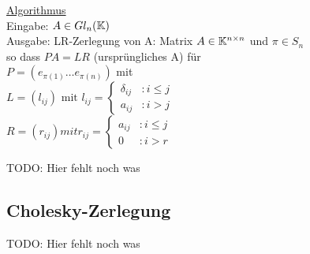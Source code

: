 \underline{Algorithmus} \\
Eingabe: $A \in Gl_n (\mathbb K)$ \\
Ausgabe: LR-Zerlegung von A:  Matrix $ A \in \mathbb K^{n \times n}$ und
$\pi \in S_n$ \\
so dass $PA = LR$ (ursprüngliches A) für \\
$P = (e_{\pi(1)} \dots e_{\pi(n)})$ mit \\
$L = (l_{ij}) \text{ mit } l_{ij} =
\begin{cases} \delta_{ij} &: i \le j \\  a_{ij} &: i > j  \end{cases} $ \\
$R = (r_{ij}) mit r_{ij} =
\begin{cases} a_{ij} &: i \le j \\ 0 &: i > r  \end{cases}$

TODO: Hier fehlt noch was

\subsection{Cholesky-Zerlegung}

TODO: Hier fehlt noch was
